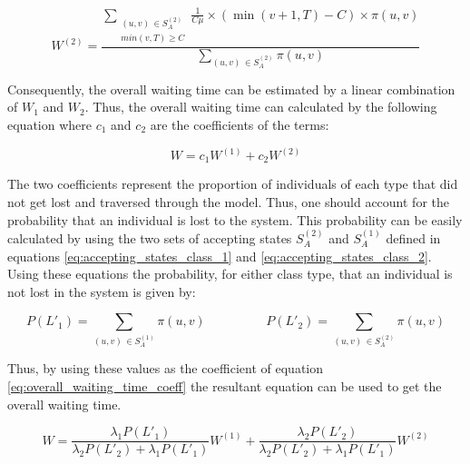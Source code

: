 \begin{equation}\label{eq:closed_form_waiting_class_2}
    W^{(2)} = \frac{\sum_{\substack{(u,v) \, \in S_A^{(2)} \\ min(v,T) \geq C}} 
    \frac{1}{C \mu} \times (\min(v+1,T)-C) \times \pi(u,v)}{\sum_{(u,v) \, 
    \in S_A^{(2)}} \pi(u,v)}
\end{equation}

Consequently, the overall waiting time can be estimated by a linear combination 
of \(W_1\) and \(W_2\). 
Thus, the overall waiting time can calculated by the following equation where 
\(c_1\) and \(c_2\) are the coefficients of the terms:

\begin{equation}\label{eq:overall_waiting_time_coeff}
    W = c_1 W^{(1)} + c_2 W^{(2)}
\end{equation}

The two coefficients represent the proportion of individuals of each type that 
did not get lost and traversed through the model.
Thus, one should account for the probability that an individual is lost to the 
system. 
This probability can be easily calculated by using the two sets of accepting 
states \(S_A^{(2)}\) and \(S_A^{(1)}\) defined in equations 
\ref{eq:accepting_states_class_1} and \ref{eq:accepting_states_class_2}. 
Using these equations the probability, for either class type, that an individual 
is not lost in the system is given by:

\begin{equation*}
    P(L'_1) = \sum_{(u,v) \, \in S_A^{(1)}} \pi(u,v) \hspace{2cm}
    P(L'_2) = \sum_{(u,v) \, \in S_A^{(2)}} \pi(u,v)
\end{equation*}
 
Thus, by using these values as the coefficient of equation 
\ref{eq:overall_waiting_time_coeff} the resultant equation can be used to get 
the overall waiting time. 

\begin{equation}\label{eq:overall_waiting_time}
    W = \frac{\lambda_1 P(L'_1)}{\lambda_2 P(L'_2) + \lambda_1 P(L'_1)} W^{(1)} + 
    \frac{\lambda_2 P(L'_2)}{\lambda_2 P(L'_2) + \lambda_1 P(L'_1)} W^{(2)}
\end{equation}
